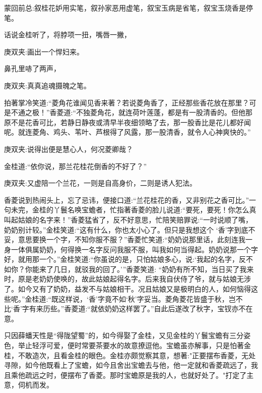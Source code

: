 
\begin{parag}
    \begin{note}蒙回前总:叙桂花妒用实笔，叙孙家恶用虚笔，叙宝玉病是省笔，叙宝玉烧香是停笔。\end{note}
\end{parag}


\begin{parag}
    话说金桂听了，将脖项一扭，嘴唇一撇，\begin{note}庚双夹:画出一个悍妇来。\end{note}鼻孔里哧了两声，\begin{note}庚双夹:真真追魂摄魄之笔。\end{note}拍著掌冷笑道:“菱角花谁闻见香来著？若说菱角香了，正经那些香花放在那里？可是不通之极！”香菱道:“不独菱角花，就连荷叶莲蓬，都是有一股清香的。但他那原不是花香可比，若静日静夜或清早半夜细领略了去，那一股香比是花儿都好闻呢。就连菱角、鸡头、苇叶、芦根得了风露，那一股清香，就令人心神爽快的。”\begin{note}庚双夹:说得出便是慧心人，何况菱卿哉？\end{note}金桂道:“依你说，那兰花桂花倒香的不好了？”\begin{note}庚双夹:又虚陪一个兰花，一则是自高身价，二则是诱人犯法。\end{note}香菱说到热闹头上，忘了忌讳，便接口道:“兰花桂花的香，又非别花之香可比。”一句未完，金桂的丫鬟名唤宝蟾者，忙指著香菱的脸儿说道:“要死，要死！你怎么真叫起姑娘的名字来！”香菱猛省了，反不好意思，忙陪笑赔罪说:“一时说顺了嘴，奶奶别计较。”金桂笑道:“这有什么，你也太小心了。但只是我想这个 ‘香’字到底不妥，意思要换一个字，不知你服不服？”香菱忙笑道:“奶奶说那里话，此刻连我一身一体俱属奶奶，何得换一名字反问我服不服，叫我如何当得起。奶奶说那一个字好，就用那一个。”金桂笑道:“你虽说的是，只怕姑娘多心，说:‘我起的名字，反不如你？你能来了几日，就驳我的回了。’”香菱笑道: “奶奶有所不知，当日买了我来时，原是老奶奶使唤的，故此姑娘起得名字。后来我自伏侍了爷，就与姑娘无涉了。如今又有了奶奶，益发不与姑娘相干。况且姑娘又是极明白的人，如何恼得这些呢。”金桂道:“既这样说，‘香’字竟不如‘秋’字妥当。菱角菱花皆盛于秋，岂不比‘香’字有来历些。”香菱道:“就依奶奶这样罢了。”自此后遂改了秋字，宝钗亦不在意。
\end{parag}


\begin{parag}
    只因薛蟠天性是“得陇望蜀”的，如今得娶了金桂，又见金桂的丫鬟宝蟾有三分姿色，举止轻浮可爱，便时常要茶要水的故意撩逗他。宝蟾虽亦解事，只是怕著金桂，不敢造次，且看金桂的眼色。金桂亦颇觉察其意，想著:"正要摆布香菱，无处寻隙，如今他既看上了宝蟾，如今且舍出宝蟾去与他，他一定就和香菱疏远了，我且乘他疏远之时，便摆布了香菱。那时宝蟾原是我的人，也就好处了。"打定了主意，伺机而发。
\end{parag}


